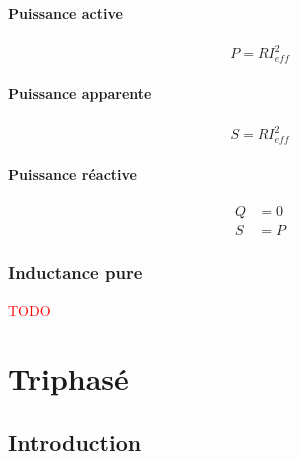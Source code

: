 \documentclass{report}
\begin{document}
\subsubsection{Puissance active}
\begin{align*}
P = R I_{eff}^2
\end{align*}

\subsubsection{Puissance apparente}
\begin{align*}
S = R I_{eff}^2
\end{align*}

\subsubsection{Puissance réactive}
\begin{align*}
Q &= 0\\
S &= P
\end{align*}

\subsection{Inductance pure}
\textcolor{red}{TODO}

\chapter{Triphasé}
\section{Introduction}
\end{document}
